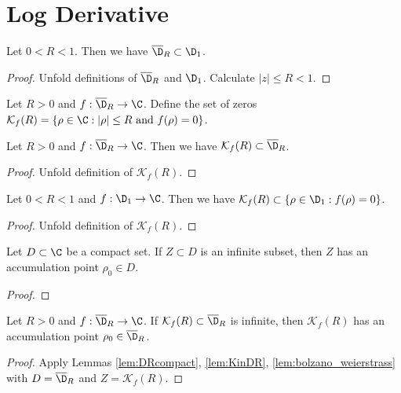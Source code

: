 \chapter{Log Derivative}\label{log_derivative}


\begin{lemma} \label{lem:DRinD1} 
\leanok
Let $0<R<1$. Then we have $\overline{\D}_R \subset \D_1$.
\end{lemma}
\begin{proof}
\leanok
Unfold definitions of $\overline{\D}_R$ and $\D_1$. Calculate $|z|\le R<1$.
\end{proof}

\begin{definition} \label{def:zerosetKfR} 
\leanok
Let $R>0$ and $f:\overline{\D}_R\to \C$. Define the set of zeros $\mathcal{K}_f(R) = \{\rho \in \C : |\rho| \le R \text{ and } f(\rho)=0\}$.
\end{definition}

\begin{lemma} \label{lem:KinDR} 
\leanok
Let $R>0$ and $f:\overline{\D}_R\to\C$. Then we have $\mathcal{K}_f(R) \subset \overline{\D}_R$.
\end{lemma}
\begin{proof}
\leanok
{}
Unfold definition of $\mathcal{K}_f(R)$.
\end{proof}

\begin{lemma} \label{lem:KRinK1} 
\leanok
Let $0<R<1$ and $f:\D_1\to\C$. Then we have $\mathcal{K}_f(R) \subset \{\rho\in \D_1 : f(\rho)=0 \}$.
\end{lemma}
\begin{proof}
\leanok
{}
Unfold definition of $\mathcal{K}_f(R)$.
\end{proof}


\begin{lemma} \label{lem:bolzano_weierstrass} 
\leanok
Let $D\subset \C$ be a compact set. If $Z\subset D$ is an infinite subset, then $Z$ has an accumulation point $\rho_0\in D$.
\end{lemma}
\begin{proof}
\leanok
\end{proof}


\begin{lemma}\label{lem:zeros_have_limit_point} 
\leanok
Let $R>0$ and $f:\overline{\D}_R\to \C$. If $\mathcal{K}_f(R) \subset \overline{\D}_R$ is infinite, then $\mathcal{K}_f(R)$ has an accumulation point $\rho_0 \in \overline{\D}_R$.
\end{lemma}
\begin{proof}
\leanok
{}
Apply Lemmas \ref{lem:DRcompact}, \ref{lem:KinDR}, \ref{lem:bolzano_weierstrass} with $D=\overline{\D}_R$ and $Z = \mathcal{K}_f(R)$.
\end{proof}



